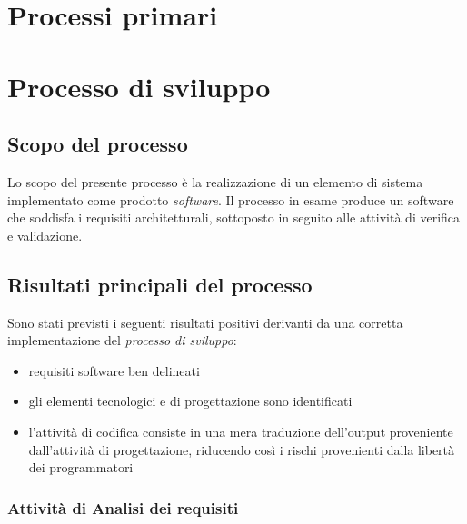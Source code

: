 

\section{Processi primari}
	\section{Processo di sviluppo}
        \subsection{Scopo del processo}
        Lo scopo del presente processo \`e la realizzazione di un elemento di sistema implementato come prodotto
        \textit{software}. Il processo in esame produce un software che soddisfa i requisiti architetturali, sottoposto
        in seguito alle attivit\`a di verifica e validazione.
        \subsection{Risultati principali del processo}
        Sono stati previsti i seguenti risultati positivi derivanti da una corretta implementazione del \textit{processo di sviluppo}:
        \begin{itemize}
          \item requisiti software ben delineati
          \item gli elementi tecnologici e di progettazione sono identificati
          \item l'attivit\`a di codifica consiste in una mera traduzione dell'output proveniente dall'attivit\`a di progettazione,
            riducendo cos\`i i rischi provenienti dalla libert\`a dei programmatori
        \end{itemize}
        
		\subsubsection{Attività di Analisi dei requisiti}
